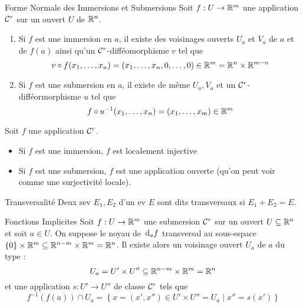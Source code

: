 \documentclass{cours}
\begin{document}
\begin{théorème}{Forme Normale des Immersions et Submersions}{}
    Soit $f : U \to \mathbb{R}^{m}$ une application $\mathcal{C}^{r}$ sur un ouvert $U$ de $\mathbb{R}^{n}$.
    \begin{enumerate}
        \item Si $f$ est une immersion en $a$, il existe des voisinages ouverts $U_{a}$ et $V_{a}$ de $a$ et de $f(a)$ ainsi qu'un $\mathcal{C}^{r}$-difféomorphisme $v$ tel que
        \[
            v \circ f(x_{1}, \ldots, x_{n}) = (x_{1}, \ldots, x_{n}, 0, \ldots, 0) \in \mathbb{R}^{m} = \mathbb{R}^{n} \times \mathbb{R}^{m - n}
        \]
        \item Si $f$ est une submersion en $a$, il existe de même $U_{a}, V_{a}$ et un $\mathcal{C}^{r}$-difféormorphisme $u$ tel que 
        \[
            f \circ u^{-1}(x_{1}, \ldots, x_{n}) = \left(x_{1}, \ldots, x_{m}\right) \in \mathbb{R}^{m}
        \]
    \end{enumerate}
\end{théorème}

\begin{corollaire}{}{}
    Soit $f$ une application $\mathcal{C}^{r}$.
    \begin{itemize}
        \item Si $f$ est une immersion, $f$ est localement injective
        \item Si $f$ est une submersion, $f$ est une application ouverte (qu'on peut voir comme une surjectivité locale).
    \end{itemize}
\end{corollaire}

\begin{définition}{Transversalité}{}
    Deux sev $E_{1}, E_{2}$ d'un ev $E$ sont dits transversaux si $E_{1} + E_{2} = E$.
\end{définition}

\begin{théorème}{Fonctions Implicites}{}
    Soit $f : U \to \mathbb{R}^{m}$ une submersion $\mathcal{C}^{r}$ sur un ouvert $U \subseteq \mathbb{R}^{n}$ et soit $a \in U$. On suppose le noyau de ${\rm \, d}_{a}f$ transversal au sous-espace $\{0\} \times \mathbb{R}^{m} \subseteq \mathbb{R}^{n - m} \times\mathbb{R}^{m} = \mathbb{R}^{n}$. Il existe alors un voisinage ouvert $U_{a}$ de $a$ du type : 
    \[
        U_{a} = U' \times U'' \subseteq \mathbb{R}^{n - m} \times \mathbb{R}^{m} = \mathbb{R}^{n}
    \]
    et une application $s : U' \to U''$ de classe $\mathcal{C}^{r}$ tels que 
    \[
        f^{-1}(f(a)) \cap U_{a} = \left\{x = (x', x'') \in U'\times U'' = U_{a} \mid x'' = s(x')\right\}
    \]
\end{théorème}
\end{document}
